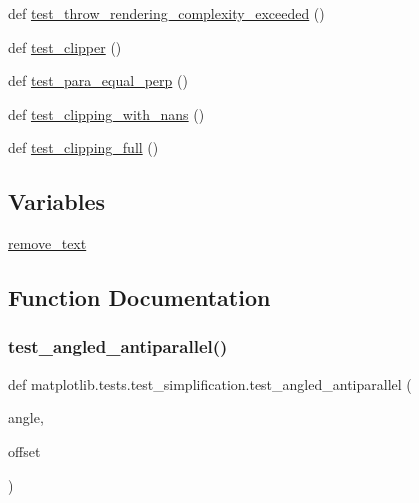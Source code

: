 \begin{DoxyCompactItemize}
\item 
def \hyperlink{namespacematplotlib_1_1tests_1_1test__simplification_a4cec4911ab5c96ae9b7e41ad8a946795}{test\+\_\+throw\+\_\+rendering\+\_\+complexity\+\_\+exceeded} ()
\item 
def \hyperlink{namespacematplotlib_1_1tests_1_1test__simplification_a1c14704ac0536610df959b4612ae51cd}{test\+\_\+clipper} ()
\item 
def \hyperlink{namespacematplotlib_1_1tests_1_1test__simplification_ac6c2b397f2da2798c75819673e9ab6d4}{test\+\_\+para\+\_\+equal\+\_\+perp} ()
\item 
def \hyperlink{namespacematplotlib_1_1tests_1_1test__simplification_a2d4ca327af0f33f7aabf0b49521900ed}{test\+\_\+clipping\+\_\+with\+\_\+nans} ()
\item 
def \hyperlink{namespacematplotlib_1_1tests_1_1test__simplification_ab440f5c36206faee1c1f34613bb6ee7f}{test\+\_\+clipping\+\_\+full} ()
\end{DoxyCompactItemize}
\subsection*{Variables}
\begin{DoxyCompactItemize}
\item 
\hyperlink{namespacematplotlib_1_1tests_1_1test__simplification_a7a6249735d1a254c9250fe68f9def601}{remove\+\_\+text}
\end{DoxyCompactItemize}


\subsection{Function Documentation}
\mbox{\label{namespacematplotlib_1_1tests_1_1test__simplification_a2388bf2aba866574961ffe5d28d19d23}} 
\subsubsection{\texorpdfstring{test\+\_\+angled\+\_\+antiparallel()}{test\_angled\_antiparallel()}}
{\footnotesize\ttfamily def matplotlib.\+tests.\+test\+\_\+simplification.\+test\+\_\+angled\+\_\+antiparallel (\begin{DoxyParamCaption}\item[{}]{angle,  }\item[{}]{offset }\end{DoxyParamCaption})}

